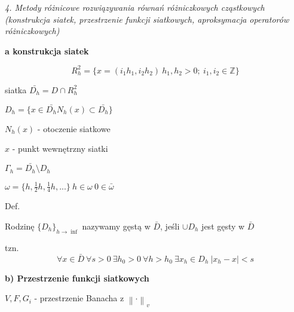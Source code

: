 \textit{4. Metody różnicowe rozwiązywania równań różniczkowych cząstkowych (konstrukcja siatek, przestrzenie funkcji siatkowych, aproksymacja operatorów różniczkowych)}

\textbf{a\) konstrukcja siatek}

\[R^{2}_{h} = \{ x = (i_{1}h_{1}, i_{2}h_{2})\ h_{1},h_{2} > 0;\ i_{1},i_{2} \in \mathbb{Z}\}\]

siatka $\bar{D_{h}} = D \cap R^{2}_{h}$

$D_{h} = \{ x \in \bar{D_{h}} N_h(x) \subset \bar{D_{h}}\}$

$N_h(x)$ - otoczenie siatkowe

$x$ - punkt wewnętrzny siatki

$\Gamma_h = \bar{D_h} \setminus D_h$

$\omega = \{h, \frac{1}{2}h, \frac{1}{4}h, ...\}\ h \in \omega\ 0 \in \bar{\omega}$

Def.

Rodzinę $\{D_h\}_{h \rightarrow \inf}$ nazywamy gęstą w $\bar{D}$, jeśli $\cup D_h$ jest gęsty w $\bar{D}$

tzn.
\[\forall x \in \bar{D}\ \forall s > 0\ \exists h_0 > 0\ \forall h > h_0\ \exists x_h \in D_h\ |x_h - x| < s\]

\textbf{b) Przestrzenie funkcji siatkowych}

$V, F, G_i$ - przestrzenie Banacha z $\left \| \cdot \right \|_v$